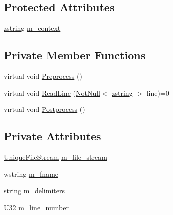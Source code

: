 \subsection*{Protected Attributes}
\begin{DoxyCompactItemize}
\item 
\mbox{\hyperlink{namespacemage_a4163ec9a9a27d5e7f4b452dcb99cb2b9}{zstring}} \mbox{\hyperlink{classmage_1_1_line_reader_ae1f715152d14188cc490870e307099d8}{m\+\_\+context}}
\end{DoxyCompactItemize}
\subsection*{Private Member Functions}
\begin{DoxyCompactItemize}
\item 
virtual void \mbox{\hyperlink{classmage_1_1_line_reader_a4de135cfb0434be786cfcfd7959031ef}{Preprocess}} ()
\item 
virtual void \mbox{\hyperlink{classmage_1_1_line_reader_ae50ac0637eddead37a7a9cca2a570072}{Read\+Line}} (\mbox{\hyperlink{namespacemage_a8769f9d670d6b585ea306cb1062af94b}{Not\+Null}}$<$ \mbox{\hyperlink{namespacemage_a4163ec9a9a27d5e7f4b452dcb99cb2b9}{zstring}} $>$ line)=0
\item 
virtual void \mbox{\hyperlink{classmage_1_1_line_reader_adfde21013140a1058d3dd567204abfb5}{Postprocess}} ()
\end{DoxyCompactItemize}
\subsection*{Private Attributes}
\begin{DoxyCompactItemize}
\item 
\mbox{\hyperlink{namespacemage_a0ee1bd45ad7dbb3dc8c8e1770e3538d4}{Unique\+File\+Stream}} \mbox{\hyperlink{classmage_1_1_line_reader_a510ff5355c6d26d7c29dc692ef18a3e2}{m\+\_\+file\+\_\+stream}}
\item 
wstring \mbox{\hyperlink{classmage_1_1_line_reader_ad6f55ba12fc610ab2fc1c26a48d12321}{m\+\_\+fname}}
\item 
string \mbox{\hyperlink{classmage_1_1_line_reader_a6de3398ac59fdd98f8c40cff6f5c1075}{m\+\_\+delimiters}}
\item 
\mbox{\hyperlink{namespacemage_a41c104c036fba3756a74e19f793eeaa1}{U32}} \mbox{\hyperlink{classmage_1_1_line_reader_ab145590a7e115106c0987905fde98393}{m\+\_\+line\+\_\+number}}
\end{DoxyCompactItemize}


